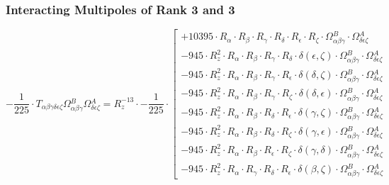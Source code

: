 \documentclass{article}
\begin{document}
\subsubsection*{Interacting Multipoles of Rank 3 and 3}
\begin{equation}
- \frac{1}{225} \cdot T_{\alpha{}\beta{}\gamma{}\delta{}\epsilon{}\zeta{}} \Omega{}^{B}_{\alpha{}\beta{}\gamma{}} \Omega{}^{A}_{\delta{}\epsilon{}\zeta{}} = R_{z}^{-13} \cdot - \frac{1}{225} \cdot  \left[ \begin{array}{c} 
 		+ 10395 \cdot R_{\alpha{}} \cdot R_{\beta{}} \cdot R_{\gamma{}} \cdot R_{\delta{}} \cdot R_{\epsilon{}} \cdot R_{\zeta{}} \cdot \Omega{}^{B}_{\alpha{}\beta{}\gamma{}} \cdot \Omega{}^{A}_{\delta{}\epsilon{}\zeta{}} 
 \\[0.2em] 		 - 945 \cdot R_{z}^{2} \cdot R_{\alpha{}} \cdot R_{\beta{}} \cdot R_{\gamma{}} \cdot R_{\delta{}} \cdot \delta{}\left(\epsilon{}, \zeta{}\right) \cdot \Omega{}^{B}_{\alpha{}\beta{}\gamma{}} \cdot \Omega{}^{A}_{\delta{}\epsilon{}\zeta{}} 
 \\[0.2em] 		 - 945 \cdot R_{z}^{2} \cdot R_{\alpha{}} \cdot R_{\beta{}} \cdot R_{\gamma{}} \cdot R_{\epsilon{}} \cdot \delta{}\left(\delta{}, \zeta{}\right) \cdot \Omega{}^{B}_{\alpha{}\beta{}\gamma{}} \cdot \Omega{}^{A}_{\delta{}\epsilon{}\zeta{}} 
 \\[0.2em] 		 - 945 \cdot R_{z}^{2} \cdot R_{\alpha{}} \cdot R_{\beta{}} \cdot R_{\gamma{}} \cdot R_{\zeta{}} \cdot \delta{}\left(\delta{}, \epsilon{}\right) \cdot \Omega{}^{B}_{\alpha{}\beta{}\gamma{}} \cdot \Omega{}^{A}_{\delta{}\epsilon{}\zeta{}} 
 \\[0.2em] 		 - 945 \cdot R_{z}^{2} \cdot R_{\alpha{}} \cdot R_{\beta{}} \cdot R_{\delta{}} \cdot R_{\epsilon{}} \cdot \delta{}\left(\gamma{}, \zeta{}\right) \cdot \Omega{}^{B}_{\alpha{}\beta{}\gamma{}} \cdot \Omega{}^{A}_{\delta{}\epsilon{}\zeta{}} 
 \\[0.2em] 		 - 945 \cdot R_{z}^{2} \cdot R_{\alpha{}} \cdot R_{\beta{}} \cdot R_{\delta{}} \cdot R_{\zeta{}} \cdot \delta{}\left(\gamma{}, \epsilon{}\right) \cdot \Omega{}^{B}_{\alpha{}\beta{}\gamma{}} \cdot \Omega{}^{A}_{\delta{}\epsilon{}\zeta{}} 
 \\[0.2em] 		 - 945 \cdot R_{z}^{2} \cdot R_{\alpha{}} \cdot R_{\beta{}} \cdot R_{\epsilon{}} \cdot R_{\zeta{}} \cdot \delta{}\left(\gamma{}, \delta{}\right) \cdot \Omega{}^{B}_{\alpha{}\beta{}\gamma{}} \cdot \Omega{}^{A}_{\delta{}\epsilon{}\zeta{}} 
 \\[0.2em] 		 - 945 \cdot R_{z}^{2} \cdot R_{\alpha{}} \cdot R_{\gamma{}} \cdot R_{\delta{}} \cdot R_{\epsilon{}} \cdot \delta{}\left(\beta{}, \zeta{}\right) \cdot \Omega{}^{B}_{\alpha{}\beta{}\gamma{}} \cdot \Omega{}^{A}_{\delta{}\epsilon{}\zeta{}} 

\end{array}
\end{equation}
\end{document}
